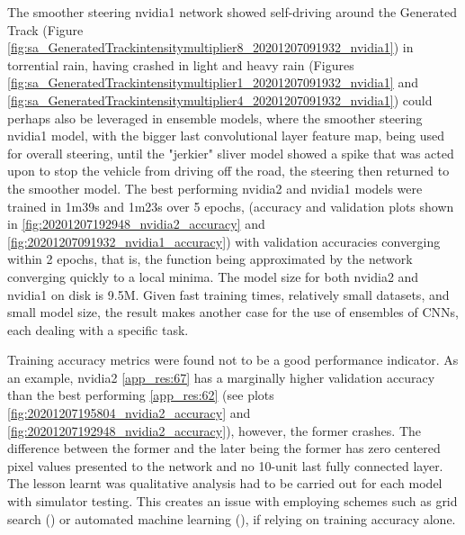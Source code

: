 The smoother steering nvidia1 network showed self-driving around the Generated Track (Figure \ref{fig:sa_GeneratedTrackintensitymultiplier8_20201207091932_nvidia1}) in torrential rain, having crashed in light and heavy rain (Figures \ref{fig:sa_GeneratedTrackintensitymultiplier1_20201207091932_nvidia1} and \ref{fig:sa_GeneratedTrackintensitymultiplier4_20201207091932_nvidia1}) could perhaps also be leveraged in ensemble models, where the smoother steering nvidia1 model, with the bigger last convolutional layer feature map, being used for overall steering, until the "jerkier" sliver model showed a spike that was acted upon to stop the vehicle from driving off the road, the steering then returned to the smoother model.
The best performing nvidia2 and nvidia1 models were trained in 1m39s and 1m23s over 5 epochs, (accuracy and validation plots shown in \ref{fig:20201207192948_nvidia2_accuracy} and \ref{fig:20201207091932_nvidia1_accuracy}) with validation accuracies converging within 2 epochs, that is, the function being approximated by the network converging quickly to a local minima. 
The model size for both nvidia2 and nvidia1 on disk is 9.5M. Given fast training times, relatively small datasets, and small model size, the result makes another case for the use of ensembles of CNNs, each dealing with a specific task.






Training accuracy metrics were found not to be a good performance indicator.
As an example, nvidia2 \ref{app_res:67} has a marginally higher validation accuracy than the best performing \ref{app_res:62} (see plots \ref{fig:20201207195804_nvidia2_accuracy} and \ref{fig:20201207192948_nvidia2_accuracy}), however, the former crashes. The difference between the former and the later being the former has zero centered pixel values presented to the network and no 10-unit last fully connected layer. The lesson learnt was qualitative analysis had to be carried out for each model with simulator testing. This creates an issue with employing schemes such as grid search (\cite{bergstra2012random}) or automated machine learning (\cite{feurer2015efficient}), if relying on training accuracy alone.

